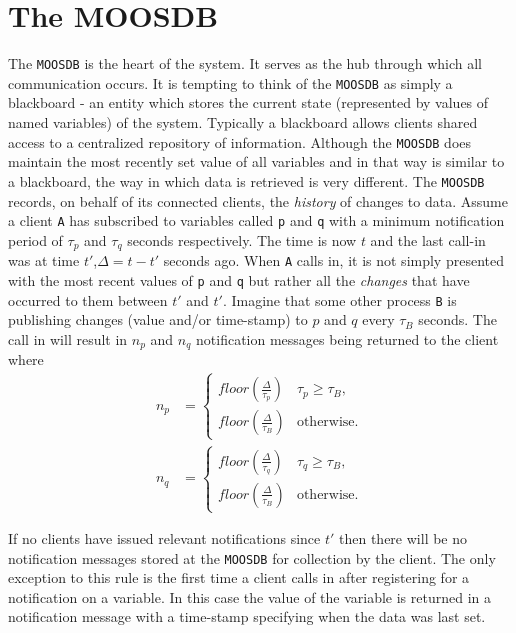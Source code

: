 \documentclass[a4paper,10pt]{article}
\newcommand{\Code}[1]{\texttt{#1} }
\newcommand{\code}[1]{\Code{#1} }
\newcommand{\DB}   {\code{{MOOSDB}}}
\begin{document}
\section{The MOOSDB}\label{sec:DB}
The \DB is the heart of the system. It serves as the hub through
which all communication occurs. It is tempting to think of the \DB
as simply a blackboard - an entity which stores the current state
(represented by values of named variables) of the system.
Typically a blackboard allows clients shared access to a
centralized repository of information. Although the \DB does
maintain the most recently set value of all variables and in that
way is similar to a blackboard, the way in which data is retrieved
is very different. The \DB records, on  behalf of its connected
clients, the {\it{history}} of changes to data. Assume a client
\code{A} has subscribed to variables called \code{p} and \code{q}
with a minimum notification period of $\tau_{p}$ and  $\tau_{q}$
seconds respectively. The time is now $t$ and the last call-in was
at time $t'$,$\Delta = t-t'$ seconds ago. When \code{A} calls in,
it is not simply presented with the most recent values of \code{p}
and \code{q} but rather all the {\it{changes}} that have occurred
to them between $t'$ and $t'$. Imagine that some other process
\code{B} is publishing changes (value and/or time-stamp) to $p$
and $q$ every $\tau_B$ seconds. The call in will result in $n_p$
and $n_q$ notification messages being returned to the client where
\begin{align*}
n_p &= \begin{cases}
    floor(\frac{\Delta}{\tau_{p}}) & \text{$\tau_{p} \geq \tau_B$}, \\
    floor(\frac{\Delta}{\tau_{B}}) & \text{otherwise}.
  \end{cases}\\
n_q &= \begin{cases}
    floor(\frac{\Delta}{\tau_{q}}) & \text{$\tau_{q} \geq \tau_B$}, \\
    floor(\frac{\Delta}{\tau_{B}}) & \text{otherwise}.
  \end{cases}
\end{align*}

If no clients have issued relevant notifications since $t'$ then
there will be no notification messages stored at the \DB for
collection by the client. The only exception to this rule is the
first time a client calls in after registering for a notification
on a variable. In this case the value of the variable is returned
in a notification message with a time-stamp specifying when the
data was last set.
\end{document}
